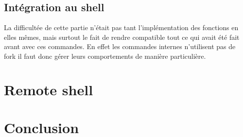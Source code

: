 \documentclass[12pt]{article}
\begin{document}
 \subsection{Intégration au shell}
 
 La difficultée de cette partie n'était pas tant l'implémentation des fonctions en elles mêmes,
 mais surtout le fait de rendre compatible tout ce qui avait été fait avant avec ces commandes.
 En effet les commandes internes n'utilisent pas de fork il faut donc gérer leurs comportements
 de manière particulière.

\newpage
\section{Remote shell}


\newpage
\section{Conclusion}
\end{document}
